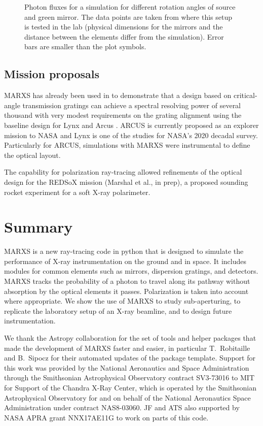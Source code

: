 \documentclass[twocolumn]{aastex61}
\begin{document}
\begin{figure}[ht!]
\caption{Photon fluxes for a simulation for different rotation angles of
source and green mirror. The data points are taken from \citet{2013SPIE.8861E..1DM} where this setup is tested in the lab (physical dimensions for the mirrors and the distance between the elements differ from the simulation). Error bars are smaller than the plot symbols.}
    \label{fig:polcurve}
\end{figure}



\subsection{Mission proposals}
\label{sect:use}
MARXS has already been used in \citet{2016SPIE.9905E..56G} to
demonstrate that a design based on critical-angle transmission
gratings \citep{2015SPIE.9603E..14H} can achieve a spectral
resolving power of several thousand with very modest requirements on
the grating alignment using the baseline design for Lynx
\citep{2015SPIE.9601E..0JG} and Arcus
\citep{doi:10.1117/12.2062671}. ARCUS is currently proposed as an
explorer mission to NASA and Lynx is one of the studies for NASA's 2020
decadal survey. Particularly for ARCUS, simulations with MARXS were
instrumental to define the optical layout.

The capability for polarization ray-tracing allowed refinements of the
optical design for the REDSoX mission (Marshal et al., in prep), a
proposed sounding rocket experiment for a soft X-ray polarimeter.


\section{Summary}
\label{sect:summary}
MARXS is a new ray-tracing code in python that is designed to simulate the
performance of X-ray instrumentation on the ground and in space. It includes
modules for common elements such as mirrors, dispersion gratings, and
detectors. MARXS tracks the probability of a photon to travel along its
pathway without absorption by the optical elements it passes. Polarization is
taken into account where appropriate. We show the use of MARXS to study
sub-aperturing, to replicate the laboratory setup of an X-ray beamline, and to
design future instrumentation.

\acknowledgments 
We thank the Astropy collaboration for the set of tools and
helper packages that made the development of MARXS faster and easier, in
particular T.\ Robitaille and B.\ Sipocz for their automated updates of the package template. Support for this work was
provided by the National Aeronautics and Space Administration through the
Smithsonian Astrophysical Observatory contract SV3-73016 to MIT for Support of
the Chandra X-Ray Center, which is operated by the Smithsonian Astrophysical
Observatory for and on behalf of the National Aeronautics Space Administration
under contract NAS8-03060. JF and ATS also supported by NASA APRA
grant NNX17AE11G to work on parts of this code.
\end{document}
